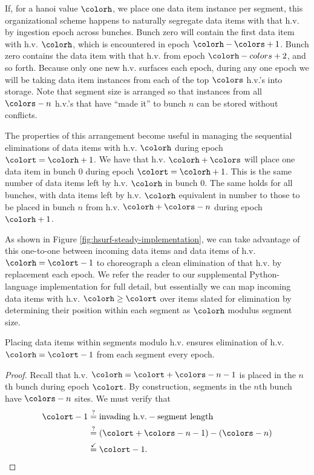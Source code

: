 If, for a hanoi value $\colorh$, we place one data item instance per segment, this organizational scheme happens to naturally segregate data items with that h.v. by ingestion epoch across bunches.
Bunch zero will contain the first data item with h.v. $\colorh$, which is encountered in epoch $\colorh - \colors + 1$.
Bunch zero contains the data item with that h.v. from epoch $\colorh - colors + 2$, and so forth.
Because only one new h.v. surfaces each epoch, during any one epoch we will be taking data item instances from each of the top $\colors$ h.v.'s into storage.
Note that segment size is arranged so that instances from all $\colors - n$ h.v.'s that have ``made it'' to bunch $n$ can be stored without conflicts.



The properties of this arrangement become useful in managing the sequential eliminations of data items with h.v. $\colorh$ during epoch $\colort=\colorh + 1$.
We have that h.v. $\colorh + \colors$ will place one data item in bunch 0 during epoch $\colort=\colorh + 1$.
This is the same number of data items left by h.v. $\colorh$ in bunch 0.
The same holds for all bunches, with data items left by h.v. $\colorh$ equivalent in number to those to be placed in bunch $n$ from h.v. $\colorh + \colors - n$ during epoch $\colorh + 1$.

As shown in Figure \ref{fig:hsurf-steady-implementation}, we can take advantage of this one-to-one between incoming data items and data items of h.v. $\colorh=\colort-1$ to choreograph a clean elimination of that h.v. by replacement each epoch.
We refer the reader to our supplemental Python-language implementation for full detail, but essentially we can map incoming data items with h.v. $\colorh \geq \colort$ over items slated for elimination by determining their position within each segment as $\colorh$ modulus segment size.

\begin{lemma}
Placing data items within segments modulo h.v. ensures elimination of h.v. $\colorh = \colort - 1$ from each segment every epoch.
\end{lemma}
\begin{proof}
Recall that h.v. $\colorh = \colort + \colors - n - 1$ is placed in the $n$th bunch during epoch $\colort$.
By construction, segments in the $n$th bunch have $\colors - n$ sites.
We must verify that
\begin{align*}
\colort - 1
&\stackrel{?}{=}
\text{invading h.v.} - \text{segment length}\\
&\stackrel{?}{=}
(\colort + \colors - n - 1) - (\colors - n)
 \\
&\stackrel{\checkmark}{=} \colort - 1.
\end{align*}
\end{proof}

